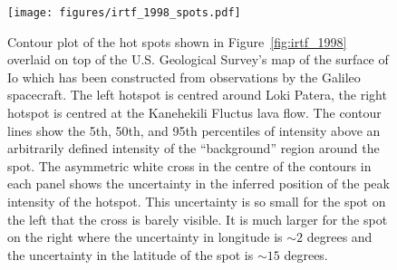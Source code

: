 \documentclass[12pt,dvipsnames]{report}
\begin{document}
\begin{figure}[ht!]
    \begin{centering}
    \texttt{[image: figures/irtf\_1998\_spots.pdf]}
    \caption{
        Contour plot of the hot spots shown in Figure~\ref{fig:irtf_1998} overlaid on top of the U.S. Geological Survey's map of the surface of Io which has been constructed from observations by the Galileo spacecraft.
        The left hotspot is centred around Loki Patera, the right hotspot is centred at the Kanehekili Fluctus lava flow.
The contour lines show the 5th, 50th, and 95th percentiles of intensity above an arbitrarily defined intensity of the ``background'' region around the spot.
        The asymmetric white cross in the centre of the contours in each panel shows the uncertainty in the inferred position of the peak intensity of the hotspot.
        This uncertainty is so small for the spot on the left that the cross is barely visible.
        It is much larger for the spot on the right where the uncertainty in longitude is $\sim 2$ degrees and the uncertainty in the latitude of the spot is $\sim 15$ degrees.
    }
        \label{fig:irtf_1998_spots}
    \end{centering}
\end{figure}
\end{document}
